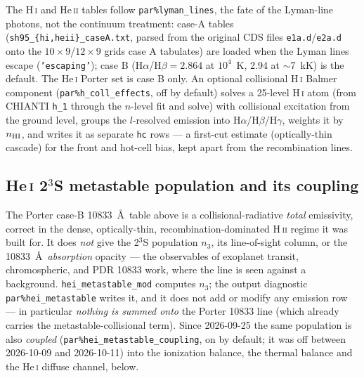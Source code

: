 \documentclass[english,a4paper]{my_memo}
\newcommand{\code}[1]{\texttt{#1}}
\begin{document}
The H\,\textsc{i} and He\,\textsc{ii} tables follow \code{par\%lyman\_lines},
the fate of the Lyman-line photons, not the continuum treatment: case-A tables
(\code{sh95\_\{hi,heii\}\_caseA.txt}, parsed from the original CDS files
\code{e1a.d}/\code{e2a.d} onto the $10\times9$/$12\times9$ grids case A
tabulates) are loaded when the Lyman lines escape (\code{'escaping'}); case B
(H$\alpha$/H$\beta = 2.864$ at $10^4$~K, 2.94 at $\sim$7~kK) is the default.  The He\,\textsc{i} Porter set is case B only.  An optional
collisional H\,\textsc{i} Balmer component (\code{par\%h\_coll\_effects},
off by default) solves a 25-level H\,\textsc{i} atom (from CHIANTI
\code{h\_1} through the $n$-level fit and solve) with collisional excitation from
the ground level, groups the $l$-resolved emission into
H$\alpha$/H$\beta$/H$\gamma$, weights it by $n_{\rm HI}$, and writes it as
separate \code{hc} rows --- a first-cut estimate (optically-thin cascade)
for the front and hot-cell bias, kept apart from the recombination lines.

\subsection{He\,\textsc{i} 2$^3$S metastable population and its coupling}
\label{sec:heimeta}
The Porter case-B 10833~\AA\ table above is a collisional-radiative
\emph{total} emissivity, correct in the dense, optically-thin,
recombination-dominated H\,\textsc{ii} regime it was built for.  It does
\emph{not} give the 2$^3$S population $n_3$, its line-of-sight column, or
the 10833~\AA\ \emph{absorption} opacity --- the observables of exoplanet
transit, chromospheric, and PDR 10833 work, where the line is seen against
a background.  \code{hei\_metastable\_mod} computes $n_3$; the output
diagnostic \code{par\%hei\_metastable} writes it, and it does not add or
modify any emission row --- in particular \emph{nothing is summed onto} the
Porter 10833 line (which already carries the metastable-collisional term).
Since 2026-09-25 the same population is also \emph{coupled}
(\code{par\%hei\_metastable\_coupling}, on by default; it was off between
2026-10-09 and 2026-10-11) into the ionization
balance, the thermal balance and the He\,\textsc{i} diffuse channel, below.
\end{document}
